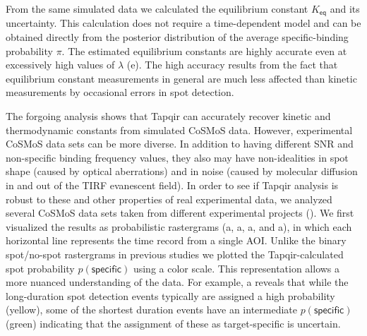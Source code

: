 From the same simulated data we calculated the equilibrium constant $K_\mathsf{eq}$ and its uncertainty. This calculation does not require a time-dependent model and can be obtained directly from the posterior distribution of the average specific-binding probability $\pi$. The estimated equilibrium constants are highly accurate even at excessively high values of $\lambda$ (e).  The high accuracy results from the fact that equilibrium constant measurements in general are much less affected than kinetic measurements by occasional errors in spot detection. 



The forgoing analysis shows that Tapqir can accurately recover kinetic and thermodynamic constants from simulated CoSMoS data.  However, experimental CoSMoS data sets can be more diverse.  In addition to having different SNR and non-specific binding frequency values, they also may have non-idealities in spot shape (caused by optical aberrations) and in noise (caused by molecular diffusion in and out of the TIRF evanescent field).  In order to see if Tapqir analysis is robust to these and other properties of real experimental data, we analyzed several CoSMoS data sets taken from different experimental projects (). We first visualized the results as probabilistic rastergrams (a, a, a, and a), in which each horizontal line represents the time record from a single AOI.  Unlike the binary spot/no-spot rastergrams in previous studies \citep{Friedman2013-sf,Rosen2020-zn} we plotted the Tapqir-calculated spot probability $p(\mathsf{specific})$ using a color scale.  This representation allows a more nuanced understanding of the data.  For example, a reveals that while the long-duration spot detection events typically are assigned a high probability (yellow), some of the shortest duration events have an intermediate $p(\mathsf{specific})$ (green) indicating that the assignment of these as target-specific is uncertain.  

